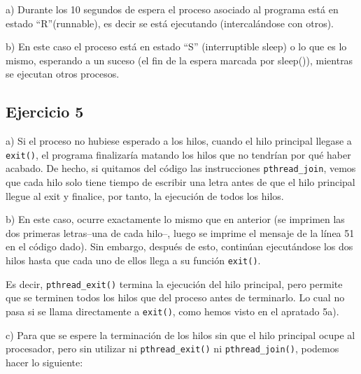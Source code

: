 \documentclass{article}
\begin{document}
a) Durante los 10 segundos de espera el proceso asociado al programa está en estado ``R''(runnable), es decir se está ejecutando (intercalándose con otros).

b) En este caso el proceso está en estado ``S'' (interruptible sleep) o lo que es lo mismo, esperando a un suceso (el fin de la espera marcada por sleep()), mientras se ejecutan otros procesos.


\subsection*{Ejercicio 5}\label{ej5}

a) Si el proceso no hubiese esperado a los hilos, cuando el hilo principal llegase a \texttt{exit()}, el programa finalizaría matando los hilos que no tendrían por qué haber acabado. De hecho, si quitamos del código las instrucciones \texttt{pthread\_join}, vemos que cada hilo solo tiene tiempo de escribir una letra antes de que el hilo principal llegue al exit y finalice, por tanto, la ejecución de todos los hilos.

b) En este caso, ocurre exactamente lo mismo que en anterior (se imprimen las dos primeras letras--una de cada hilo--, luego se imprime el mensaje de la línea 51 en el código dado). Sin embargo, después de esto, continúan ejecutándose los dos hilos hasta que cada uno de ellos llega a su función \texttt{exit()}.

Es decir, \texttt{pthread\_exit()} termina la ejecución del hilo principal, pero permite que se terminen todos los hilos que del proceso antes de terminarlo. Lo cual no pasa si se llama directamente a \texttt{exit()}, como hemos visto en el apratado 5a).

c) Para que se espere la terminación de los hilos sin que el hilo principal ocupe al procesador, pero sin utilizar ni \texttt{pthread\_exit()} ni \texttt{pthread\_join()}, podemos hacer lo siguiente:
\end{document}
